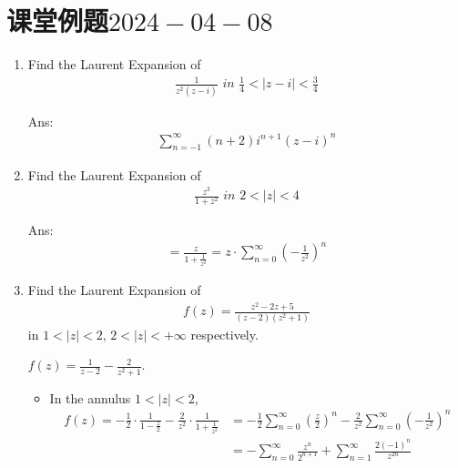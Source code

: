 \newpage

\section{课堂例题$2024-04-08$}
\begin{enumerate}
	\item Find the Laurent Expansion of 
	\begin{align}
		\frac{1}{z^2 (z - i)} \,\, in \,\, \frac{1}{4} < \left| z - i \right| < \frac{3}{4}
	\end{align}
	
	\begin{solution}
		Ans:
		\begin{align}
			\sum_{n = -1}^{\infty}{(n + 2) i^{n + 1} (z - i)^n}
		\end{align}
	\end{solution}
	
	\vspace{2em}
	
	\item Find the Laurent Expansion of 
	\begin{align}
		\frac{z^3}{1 + z^2} \,\, in \,\, 2 < \left| z \right| < 4
	\end{align}
	
	\begin{solution}
		Ans:
		\begin{align}
			= \frac{z}{1 + \frac{1}{z^2}} = z \cdot \sum_{n = 0}^{\infty}{\left( -\frac{1}{z^2} \right)^n}
		\end{align}
	\end{solution}
	
	\vspace{2em}
	
	\item Find the Laurent Expansion of
	\begin{align}
		f(z) = \frac{z^2 - 2z + 5}{(z - 2)(z^2 + 1)}
	\end{align}
	in $1 < \left| z \right| < 2$, $2 < \left| z \right| < +\infty$ respectively.
	
	\vspace{2em}
	\begin{solution}
		$f(z) = \frac{1}{z - 2} - \frac{2}{z^2 + 1}$.
		\begin{itemize}
			\item In the annulus $1 < \left| z \right| < 2$,
			\begin{align}
				f(z) 
				= -\frac{1}{2} \cdot \frac{1}{1 - \frac{z}{2}} - \frac{2}{z^2} \cdot \frac{1}{1 + \frac{1}{z^2}}
				&= -\frac{1}{2} \sum_{n = 0}^{\infty}{\left( \frac{z}{2} \right)^n} - \frac{2}{z^2} \sum_{n = 0}^{\infty}{\left( -\frac{1}{z^2} \right)^n} \\
				&= -\sum_{n = 0}^{\infty}{\frac{z^n}{2^{n + 1}}} + \sum_{n = 1}^{\infty}{\frac{2(-1)^n}{z^{2n}}}
			\end{align}
			

\end{itemize}
\end{solution}
\end{enumerate}
